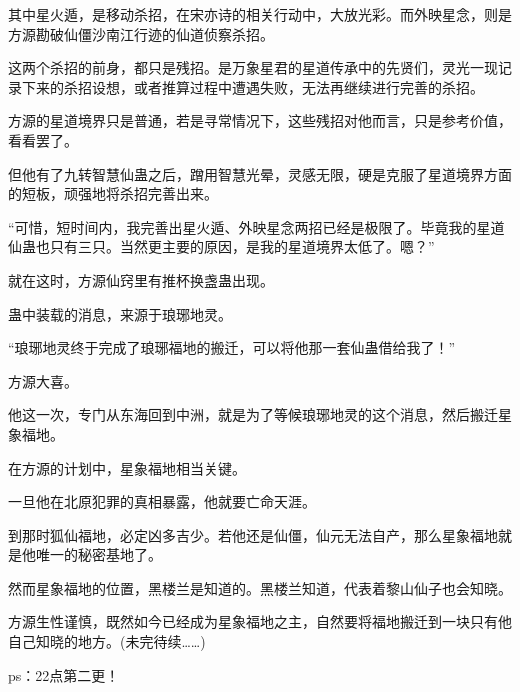 \begin{this_body}
其中星火遁，是移动杀招，在宋亦诗的相关行动中，大放光彩。而外映星念，则是方源勘破仙僵沙南江行迹的仙道侦察杀招。

这两个杀招的前身，都只是残招。是万象星君的星道传承中的先贤们，灵光一现记录下来的杀招设想，或者推算过程中遭遇失败，无法再继续进行完善的杀招。

方源的星道境界只是普通，若是寻常情况下，这些残招对他而言，只是参考价值，看看罢了。

但他有了九转智慧仙蛊之后，蹭用智慧光晕，灵感无限，硬是克服了星道境界方面的短板，顽强地将杀招完善出来。

“可惜，短时间内，我完善出星火遁、外映星念两招已经是极限了。毕竟我的星道仙蛊也只有三只。当然更主要的原因，是我的星道境界太低了。嗯？”

就在这时，方源仙窍里有推杯换盏蛊出现。

蛊中装载的消息，来源于琅琊地灵。

“琅琊地灵终于完成了琅琊福地的搬迁，可以将他那一套仙蛊借给我了！”

方源大喜。

他这一次，专门从东海回到中洲，就是为了等候琅琊地灵的这个消息，然后搬迁星象福地。

在方源的计划中，星象福地相当关键。

一旦他在北原犯罪的真相暴露，他就要亡命天涯。

到那时狐仙福地，必定凶多吉少。若他还是仙僵，仙元无法自产，那么星象福地就是他唯一的秘密基地了。

然而星象福地的位置，黑楼兰是知道的。黑楼兰知道，代表着黎山仙子也会知晓。

方源生性谨慎，既然如今已经成为星象福地之主，自然要将福地搬迁到一块只有他自己知晓的地方。(未完待续……)

ps：22点第二更！

\end{this_body}

